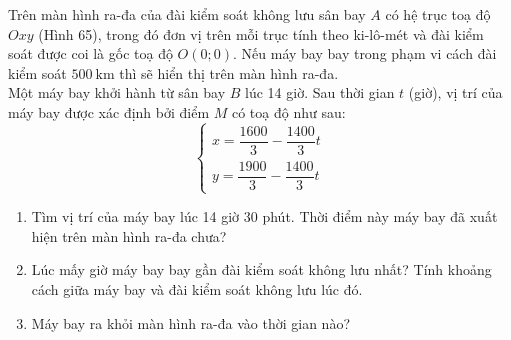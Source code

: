 \begin{bt}%
Trên màn hình ra-đa của đài kiểm soát không lưu sân bay $A$ có hệ trục toạ độ $Oxy$ (Hình 65), trong đó đơn vị trên mỗi trục tính theo ki-lô-mét và đài kiểm soát được coi là gốc toạ độ $O(0 ; 0)$. Nếu máy bay bay trong phạm vi cách đài kiểm soát $500 \mathrm{~km}$ thì sẽ hiển thị trên màn hình ra-đa.\\
Một máy bay khởi hành từ sân bay $B$ lúc 14 giờ. Sau thời gian $t$ (giờ), vị trí của máy bay được xác định bởi điểm $M$ có toạ độ như sau: 
\[\left\{ {\begin{array}{*{50}{c}}
  {x = \dfrac{{1600}}{3} - \dfrac{{1400}}{3}t} \\ 
  {y = \dfrac{{1900}}{3} - \dfrac{{1400}}{3}t} 
\end{array}} \right.\]
\begin{enumerate}
\item Tìm vị trí của máy bay lúc 14 giờ 30 phút. Thời điểm này máy bay đã xuất hiện trên màn hình ra-đa chưa?
\item Lúc mấy giờ máy bay bay gần đài kiểm soát không lưu nhất? Tính khoảng cách giữa máy bay và đài kiểm soát không lưu lúc đó.
\item Máy bay ra khỏi màn hình ra-đa vào thời gian nào?
\end{enumerate}
\end{bt}
